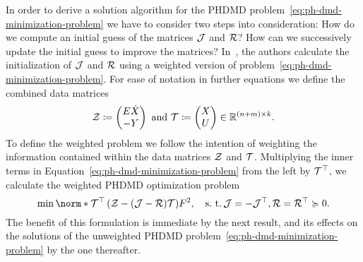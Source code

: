 In order to derive a solution algorithm for the \ac{PHDMD} problem~\eqref{eq:ph-dmd-minimization-problem} we have to consider two steps into consideration:
How do we compute an initial guess of the matrices $\mathcal{J}$ and $\mathcal{R}$?
How can we successively update the initial guess to improve the matrices?
In~\cite{Morandin2023}, the authors calculate the initialization of $\mathcal{J}$ and $\mathcal{R}$ using a weighted version of problem~\eqref{eq:ph-dmd-minimization-problem}.
For ease of notation in further equations we define the combined data matrices
\begin{equation}\label{eq:ph-dmd-data-matrices}
    \mathcal{Z} \coloneqq \begin{pmatrix}
        E \dot{X} \\
        -Y
    \end{pmatrix} \text{ and } \mathcal{T} \coloneqq \begin{pmatrix}
        X \\
        U
    \end{pmatrix} \in \mathbb{R}^{(n + m) \times k}.
\end{equation}
To define the weighted problem we follow the intention of weighting the information contained within the data matrices $\mathcal{Z}$ and $\mathcal{T}$.
Multiplying the inner terms in Equation~\eqref{eq:ph-dmd-minimization-problem} from the left by $\mathcal{T}^{\top}$, we calculate the weighted \ac{PHDMD} optimization problem
\begin{equation}\label{eq:weighted-ph-dmd}
    \min \norm*{\mcl{T}\trans \left( \mcl{Z} - (\mcl{J} - \mcl{R}) \mcl{T} \right)}{F}^2,\quad \suchthat \mcl{J} = - \mcl{J}\trans, \mcl{R} = \mcl{R}\trans \succcurlyeq 0.
\end{equation}
The benefit of this formulation is immediate by the next result, and its effects on the solutions of the unweighted \ac{PHDMD} problem~\eqref{eq:ph-dmd-minimization-problem} by the one thereafter.

